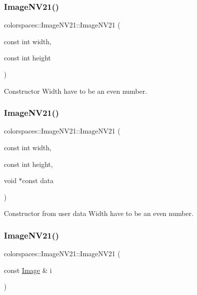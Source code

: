 \subsubsection{\texorpdfstring{Image\+N\+V21()}{ImageNV21()}\hspace{0.1cm}{\footnotesize\ttfamily [1/3]}}
{\footnotesize\ttfamily colorspaces\+::\+Image\+N\+V21\+::\+Image\+N\+V21 (\begin{DoxyParamCaption}\item[{const int}]{width,  }\item[{const int}]{height }\end{DoxyParamCaption})}

Constructor Width have to be an even number. \mbox{\label{classcolorspaces_1_1_image_n_v21_a95633670978884b2b8cef8faa1a2be18}} 
\subsubsection{\texorpdfstring{Image\+N\+V21()}{ImageNV21()}\hspace{0.1cm}{\footnotesize\ttfamily [2/3]}}
{\footnotesize\ttfamily colorspaces\+::\+Image\+N\+V21\+::\+Image\+N\+V21 (\begin{DoxyParamCaption}\item[{const int}]{width,  }\item[{const int}]{height,  }\item[{void $\ast$const}]{data }\end{DoxyParamCaption})}

Constructor from user data Width have to be an even number. \mbox{\label{classcolorspaces_1_1_image_n_v21_a0802dcb928ee0130217bd94c52e3accc}} 
\subsubsection{\texorpdfstring{Image\+N\+V21()}{ImageNV21()}\hspace{0.1cm}{\footnotesize\ttfamily [3/3]}}
{\footnotesize\ttfamily colorspaces\+::\+Image\+N\+V21\+::\+Image\+N\+V21 (\begin{DoxyParamCaption}\item[{const \hyperlink{classcolorspaces_1_1_image}{Image} \&}]{i }\end{DoxyParamCaption})}

